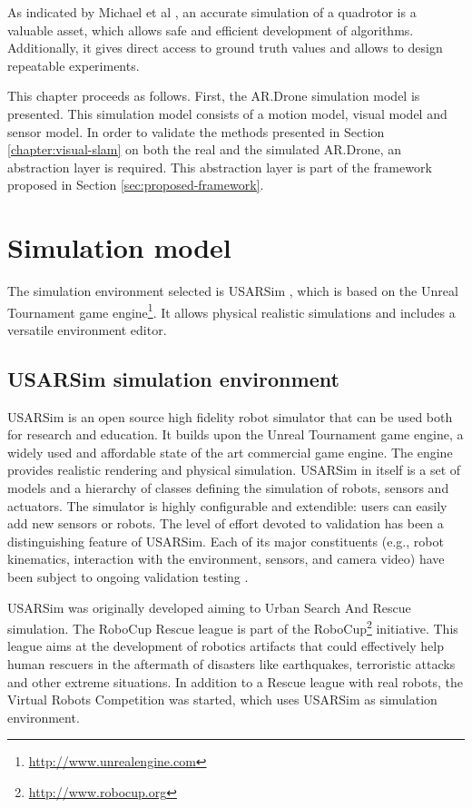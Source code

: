 As indicated by Michael et al \cite{Michael2010ra}, an accurate simulation of a quadrotor is a valuable asset, which allows safe and efficient development of %
algorithms. Additionally, it gives direct access to ground truth values and allows to design repeatable experiments.

This chapter proceeds as follows.
First, the AR.Drone simulation model is presented.
This simulation model consists of a motion model, visual model and sensor model.
In order to validate the methods presented in Section \ref{chapter:visual-slam} on both the real and the simulated AR.Drone, an abstraction layer is required.
This abstraction layer is part of the framework proposed in Section \ref{sec:proposed-framework}.

	\section{Simulation model}
The simulation environment selected is USARSim \cite{Balakirsky2009iros,carpin2007usarsim}, which is based on the Unreal Tournament game engine\footnote{\url{http://www.unrealengine.com}}.
It allows physical realistic simulations and includes a versatile environment editor.

		\subsection{USARSim simulation environment}
USARSim is an open source high fidelity robot simulator that can be used both for research and education.
It builds upon the Unreal Tournament game engine, a widely used and affordable state of the art commercial game engine.
The engine provides realistic rendering and physical simulation.
USARSim in itself is a set of models and a hierarchy of classes defining the simulation of robots, sensors and actuators.
The simulator is highly configurable and extendible: users can easily add new sensors or robots.
The level of effort devoted to validation has been a distinguishing feature of USARSim.
Each of its major constituents (e.g., robot kinematics, interaction with the environment, sensors, and camera video) have been subject to ongoing validation testing \cite{formsma2011realistic,carpin2006high,wang2005validating,carpin2007bridging,carpin2006quantitative}.

USARSim was originally developed aiming to Urban Search And Rescue simulation.
The RoboCup Rescue league is part of the RoboCup\footnote{\url{http://www.robocup.org}} initiative.
This league aims at the development of robotics artifacts that could effectively help human rescuers in the aftermath of disasters like earthquakes, terroristic attacks and other extreme situations.
In addition to a Rescue league with real robots, the Virtual Robots Competition was started, which uses USARSim as simulation environment.

